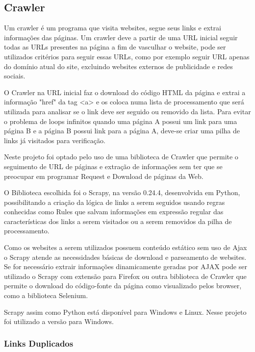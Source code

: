 \documentclass[12pt]{article}
\begin{document}
\subsection{Crawler}

Um crawler é um programa que visita websites, segue seus links e extrai informações das páginas. Um crawler deve a partir de uma URL inicial seguir todas as URLs presentes na página a fim de vasculhar o website, 
pode ser utilizados critérios para seguir essas URLs, como por exemplo seguir URL apenas do domínio atual do site, excluindo websites externos de publicidade e redes sociais.

O Crawler na URL inicial faz o download do código HTML da página e extrai a informação "href" da tag <a> e os coloca numa lista de processamento que será utilizada para analisar se o link deve ser seguido ou removido da lista. 
Para evitar o problema de loops infinitos quando uma página A possui um link para uma página B e a página B possui link para a página A, deve-se criar uma pilha de links já visitados para verificação.   
 
Neste projeto foi optado pelo uso de uma biblioteca de Crawler que permite o seguimento de URL de páginas e extração de informações sem ter que se preocupar em programar Request e Download de páginas da Web.

O Biblioteca escolhida foi o Scrapy, na versão 0.24.4, desenvolvida em Python, possibilitando a criação da lógica de links a serem seguidos usando regras conhecidas como Rules que salvam informações em expressão regular das características dos links a serem visitados ou a serem removidos da pilha de processamento.
 
Como os websites a serem utilizados possuem conteúdo estático sem uso de Ajax o Scrapy atende as necessidades básicas de download e parseamento de websites. Se for necessário extrair informações dinamicamente geradas por AJAX pode ser utilizado o Scrapy com extensão para Firefox ou outra biblioteca de Crawler que permite o download do código-fonte da página como visualizado pelos browser, como a biblioteca Selenium.

Scrapy assim como Python está disponível para Windows e Linux. Nesse projeto foi utilizado a versão para Windows.

\subsubsection{Links Duplicados}
\end{document}

